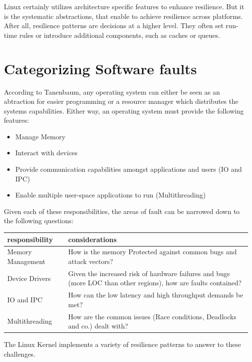 Linux certainly utilizes architecture specific features to enhance resilience. But it is the systematic abstractions, that enable to achieve resilience across platforms. After all, resilience patterns are decisions at a higher level. They often set run-time rules or introduce additional components, such as caches or queues. 

\section{Categorizing Software faults}
According to Tanenbaum, any operating system can either be seen as an abtraction for easier programming or a resource manager which distributes the systems capabilities.\cite{tanenbaum2006resource_manager} Either way, an operating system must provide the following features:

\begin{itemize}
\item Manage Memory
\item Interact with devices
\item Provide communication capabilities amongst applications and users (IO and IPC)
\item Enable multiple user-space applications to run (Multithreading)
\end{itemize}

Given each of these responsibilities, the areas of fault can be narrowed down to the following questions:

\begin{center}
\begin{tabular}{ p{} | p{} } 
 responsibility & considerations \\
 \hline
 Memory Management& How is the memory Protected against common bugs and attack vectors?\\
 Device Drivers & Given the increased risk of hardware failures and bugs (more LOC than other regions), how are faults contained?\\
 IO and IPC & How can the low latency and high throughput demands be met?\\ 
 Multithreading & How are the common issues (Race conditions, Deadlocks and co.) dealt with? \\
 
\end{tabular}
\end{center}

The Linux Kernel implements a variety of resilience patterns to answer to these challenges.
